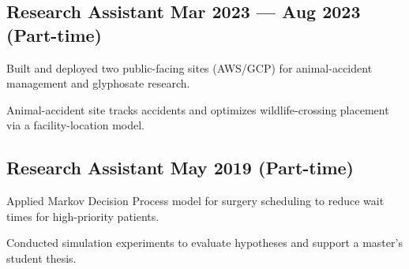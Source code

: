 \subsection{{Research Assistant \hfill Mar 2023 --- Aug 2023 (Part-time)}}
\begin{zitemize}
    \item Built and deployed two public-facing sites (AWS/GCP) for animal-accident management and glyphosate research.
    \item Animal-accident site tracks accidents and optimizes wildlife-crossing placement via a facility-location model.
\end{zitemize}

\subsection{{Research Assistant \hfill May 2019 (Part-time)}}
\begin{zitemize}
    \item Applied Markov Decision Process model for surgery scheduling to reduce wait times for high-priority patients.
    \item Conducted simulation experiments to evaluate hypotheses and support a master's student thesis.
\end{zitemize}






